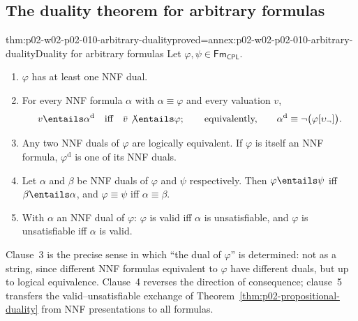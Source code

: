 \subsection{The duality theorem for arbitrary formulas}
\label{sec:p02-w02-p02-010-arbitrary}

\begin{hbtheorem}{thm:p02-w02-p02-010-arbitrary-duality}{proved=annex:p02-w02-p02-010-arbitrary-duality}{Duality for arbitrary formulas}
Let \(\varphi,\psi\in\mathsf{Fm}_{\mathsf{CPL}}\).
\begin{enumerate}
  \item \(\varphi\) has at least one NNF dual.
  \item For every NNF formula \(\alpha\) with \(\alpha\equiv\varphi\) and
        every valuation \(v\),
        \[
         v\entails\alpha^{\mathrm d}
         \quad\text{iff}\quad
         \bar v\not\entails\varphi;
         \qquad\text{equivalently,}\qquad
         \alpha^{\mathrm d}\equiv\neg\bigl(\varphi[\upsilon_{\neg}]\bigr).
        \]
  \item Any two NNF duals of \(\varphi\) are logically equivalent.  If
        \(\varphi\) is itself an NNF formula, \(\varphi^{\mathrm d}\) is one of
        its NNF duals.
  \item Let \(\alpha\) and \(\beta\) be NNF duals of \(\varphi\) and \(\psi\)
        respectively.  Then \(\varphi\entails\psi\) iff
        \(\beta\entails\alpha\), and \(\varphi\equiv\psi\) iff
        \(\alpha\equiv\beta\).
  \item With \(\alpha\) an NNF dual of \(\varphi\): \(\varphi\) is valid iff
        \(\alpha\) is unsatisfiable, and \(\varphi\) is unsatisfiable iff
        \(\alpha\) is valid.
\end{enumerate}
\end{hbtheorem}

Clause~3 is the precise sense in which ``the dual of \(\varphi\)'' is
determined: not as a string, since different NNF formulas equivalent to
\(\varphi\) have different duals, but up to logical equivalence.  Clause~4
reverses the direction of consequence; clause~5 transfers the
valid--unsatisfiable exchange of Theorem~\ref{thm:p02-propositional-duality}
from NNF presentations to all formulas.

